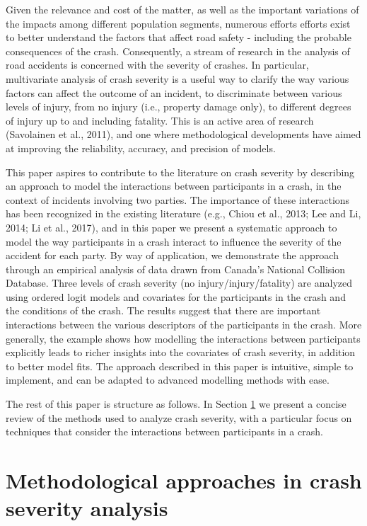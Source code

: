 \documentclass[]{elsarticle} %
\begin{document}
Given the relevance and cost of the matter, as well as the important
variations of the impacts among different population segments, numerous
efforts efforts exist to better understand the factors that affect road
safety - including the probable consequences of the crash. Consequently,
a stream of research in the analysis of road accidents is concerned with
the severity of crashes. In particular, multivariate analysis of crash
severity is a useful way to clarify the way various factors can affect
the outcome of an incident, to discriminate between various levels of
injury, from no injury (i.e., property damage only), to different
degrees of injury up to and including fatality. This is an active area
of research (Savolainen et al., 2011), and one where methodological
developments have aimed at improving the reliability, accuracy, and
precision of models.

This paper aspires to contribute to the literature on crash severity by
describing an approach to model the interactions between participants in
a crash, in the context of incidents involving two parties. The
importance of these interactions has been recognized in the existing
literature (e.g., Chiou et al., 2013; Lee and Li, 2014; Li et al.,
2017), and in this paper we present a systematic approach to model the
way participants in a crash interact to influence the severity of the
accident for each party. By way of application, we demonstrate the
approach through an empirical analysis of data drawn from Canada's
National Collision Database. Three levels of crash severity (no
injury/injury/fatality) are analyzed using ordered logit models and
covariates for the participants in the crash and the conditions of the
crash. The results suggest that there are important interactions between
the various descriptors of the participants in the crash. More
generally, the example shows how modelling the interactions between
participants explicitly leads to richer insights into the covariates of
crash severity, in addition to better model fits. The approach described
in this paper is intuitive, simple to implement, and can be adapted to
advanced modelling methods with ease.

The rest of this paper is structure as follows. In Section
\ref{sec:review-of-methods} we present a concise review of the methods
used to analyze crash severity, with a particular focus on techniques
that consider the interactions between participants in a crash.

\hypertarget{sec:review-of-methods}{%
\section{Methodological approaches in crash severity
analysis}\label{sec:review-of-methods}}
\end{document}
